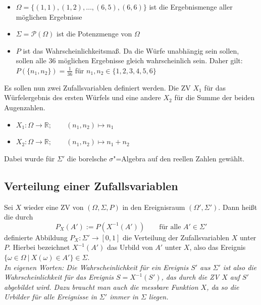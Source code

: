 \documentclass[paper=a4,10pt]{scrartcl}
\begin{document}
\begin{itemize}
\item $\Omega = \{ (1,1), (1,2), \dots, (6,5), (6,6) \}$ ist die Ergebnismenge aller möglichen Ergebnisse
\item $\Sigma = \mathcal{P}(\Omega)$ ist die Potenzmenge von $\Omega$
\item $P$ ist das Wahrscheinlichkeitsmaß. Da die Würfe unabhängig sein sollen, sollen alle 36 möglichen Ergebnisse gleich wahrscheinlich sein. Daher gilt: $P(\{ n_1, n_2\}) = \frac{1}{36}$ für $n_1, n_2 \in \{ 1,2,3,4,5,6\}$
\end{itemize}

\noindent
Es sollen nun zwei Zufallsvariablen definiert werden. Die ZV $X_1$ für das Würfelergebnis des ersten Würfels und eine andere $X_2$ für die Summe der beiden Augenzahlen.

\begin{itemize}
\item $X_1: \Omega \rightarrow \mathbb{R}; \qquad (n_1, n_2) \mapsto n_1$
\item $X_2: \Omega \rightarrow \mathbb{R}; \qquad (n_1, n_2) \mapsto n_1 + n_2$
\end{itemize}
Dabei wurde für $\Sigma'$ die borelsche $\sigma$"=Algebra auf den reellen Zahlen gewählt.

\subsection{Verteilung einer Zufallsvariablen}
Sei $X$ wieder eine ZV von $(\Omega, \Sigma, P)$ in den Ereignisraum $(\Omega', \Sigma')$. Dann heißt die durch
\begin{equation}
P_X(A') := P(X^{-1}(A')) \qquad \text{für alle }A' \in \Sigma' 
\end{equation}
definierte Abbildung $P_X: \Sigma' \rightarrow [0, 1]$ die Verteilung der Zufallsvariablen $X$ unter $P$. Hierbei bezeichnet $X^{-1}(A')$ das Urbild von $A'$ unter $X$, also das Ereignis
$\{ \omega \in \Omega \ | \ X(\omega) \in A' \} \in \Sigma$. \\

\noindent
\textit{In eigenen Worten: Die Wahrscheinlichkeit für ein Ereignis $S'$ aus $\Sigma'$ ist also die Wahrscheinlichkeit für das Ereignis $S = X^{-1}(S')$, das durch die ZV $X$ auf $S'$ abgebildet wird. Dazu braucht man auch die messbare Funktion $X$, da so die Urbilder für alle Ereignisse in $\Sigma'$ immer in $\Sigma$ liegen.}

\end{document}
